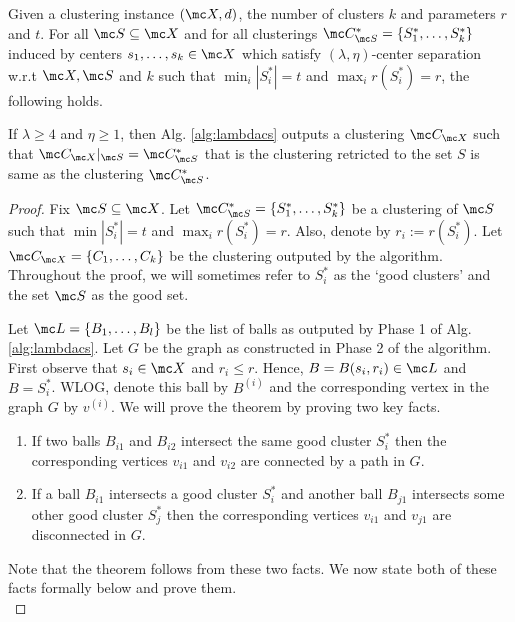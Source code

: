 \documentclass[11pt]{article}
\begin{document}
\begin{theorem}
\label{thm:lambdacsnoise}
Given a clustering instance $(\mc X, d)$, the number of clusters $k$ and parameters $r$ and $t$. For all $\mc S \subseteq \mc X$ and for all clusterings $\mc C^*_{\mc S} = \{S_1^*, \ldots, S_k^*\}$ induced by centers $s_1, \ldots, s_k \in \mc X$ which satisfy $(\lambda, \eta)$-center separation w.r.t $\mc X, \mc S$ and $k$ such that $ \min_i|S_i^*| = t$ and $\max_i r(S_i^*) = r$, the following holds.

If $\lambda \ge 4$ and $\eta \ge 1$, then Alg. \ref{alg:lambdacs} outputs a clustering $\mc C_{\mc X}$ such that $\mc C_{\mc X}|_{\mc S} = \mc C_{\mc S}^*$ that is the clustering retricted to the set $S$ is same as the clustering $\mc C_{\mc S}^*$.
\end{theorem}
\begin{proof}
Fix $\mc S \subseteq \mc X$. Let $\mc C_{\mc S}^* = \{S_1^*, \ldots, S_k^*\}$ be a clustering of $\mc S$ such that $\min |S_i^*| = t$ and $\max_i r(S_i^*) = r$. Also, denote by $r_i := r(S_i^*)$. Let $\mc C_{\mc X} = \{C_1, \ldots, C_k\}$ be the clustering outputed by the algorithm. Throughout the proof, we will sometimes refer to $S_i^*$ as the `good clusters' and the set $\mc S$ as the good set.

Let $\mc L = \{B_1, \ldots, B_l\}$ be the list of balls as outputed by Phase 1 of Alg. \ref{alg:lambdacs}. Let $G$ be the graph as constructed in Phase 2 of the algorithm. First observe that $s_i \in \mc X$ and $r_i \le r$. Hence, $B = B(s_i, r_i) \in \mc L$ and $B = S_i^*$. WLOG, denote this ball by $B^{(i)}$ and the corresponding vertex in the graph $G$ by $v^{(i)}$. We will prove the theorem by proving two key facts.  

\begin{enumerate}[nolistsep, noitemsep, label=\textbf{F.\arabic*}]
\renewcommand\labelitemi{$\diamond$}
\item \label{fact:lambda1} If two balls $B_{i1}$ and $B_{i2}$ intersect the same good cluster $S_i^*$ then the corresponding vertices $v_{i1}$ and $v_{i2}$ are connected by a path in $G$.
\item \label{fact:lambda2} If a ball $B_{i1}$ intersects a good cluster $S_i^*$ and another ball $B_{j1}$ intersects some other good cluster $S_j^*$ then the corresponding vertices $v_{i1}$ and $v_{j1}$ are disconnected in $G$.	
\end{enumerate}
Note that the theorem follows from these two facts. We now state both of these facts formally below and prove them.\\


\end{proof}
\end{document}
